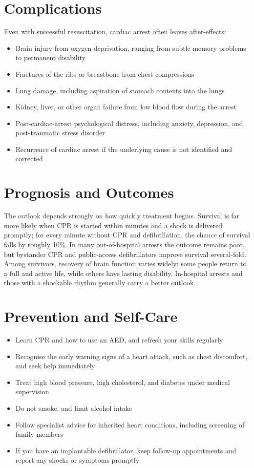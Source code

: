 \section*{Complications}
Even with successful resuscitation, cardiac arrest often leaves after-effects:
\begin{itemize}
    \item Brain injury from oxygen deprivation, ranging from subtle memory problems to permanent disability
    \item Fractures of the ribs or breastbone from chest compressions
    \item Lung damage, including aspiration of stomach contents into the lungs
    \item Kidney, liver, or other organ failure from low blood flow during the arrest
    \item Post-cardiac-arrest psychological distress, including anxiety, depression, and post-traumatic stress disorder
    \item Recurrence of cardiac arrest if the underlying cause is not identified and corrected
\end{itemize}

\section*{Prognosis and Outcomes}
The outlook depends strongly on how quickly treatment begins. Survival is far more likely when CPR is started within minutes and a shock is delivered promptly; for every minute without CPR and defibrillation, the chance of survival falls by roughly 10\%. In many out-of-hospital arrests the outcome remains poor, but bystander CPR and public-access defibrillators improve survival several-fold. Among survivors, recovery of brain function varies widely: some people return to a full and active life, while others have lasting disability. In-hospital arrests and those with a shockable rhythm generally carry a better outlook.

\section*{Prevention and Self-Care}
\begin{itemize}
    \item Learn CPR and how to use an AED, and refresh your skills regularly
    \item Recognise the early warning signs of a heart attack, such as chest discomfort, and seek help immediately
    \item Treat high blood pressure, high cholesterol, and diabetes under medical supervision
    \item Do not smoke, and limit alcohol intake
    \item Follow specialist advice for inherited heart conditions, including screening of family members
    \item If you have an implantable defibrillator, keep follow-up appointments and report any shocks or symptoms promptly
\end{itemize}

